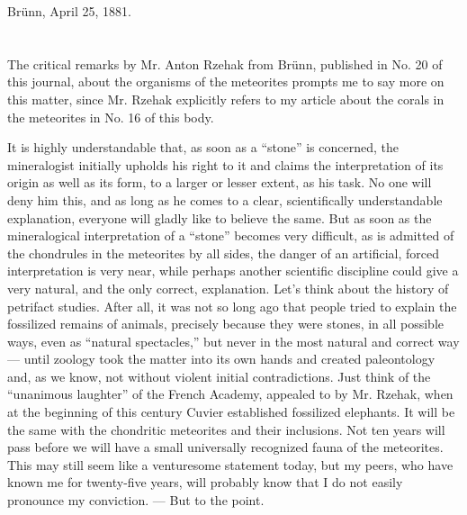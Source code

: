 \documentclass[a4paper, 12pt, oneside]{article}
\begin{document}
Brünn, April 25, 1881.
\clearpage
\section{}
\paragraph*{}
The critical remarks by Mr. Anton Rzehak from Brünn, published in No. 20 of this journal, about the organisms of the meteorites prompts me to say more on this matter, since Mr. Rzehak explicitly refers to my article about the corals in the meteorites in No. 16 of this body.

It is highly understandable that, as soon as a ``stone'' is concerned, the mineralogist initially upholds his right to it and claims the interpretation of its origin as well as its form, to a larger or lesser extent, as his task. No one will deny him this, and as long as he comes to a clear, scientifically understandable explanation, everyone will gladly like to believe the same. But as soon as the mineralogical interpretation of a ``stone'' becomes very difficult, as is admitted of the chondrules in the meteorites by all sides, the danger of an artificial, forced interpretation is very near, while perhaps another scientific discipline could give a very natural, and the only correct, explanation. Let's think about the history of petrifact studies. After all, it was not so long ago that people tried to explain the fossilized remains of animals, precisely because they were stones, in all possible ways, even as ``natural spectacles,'' but never in the most natural and correct way --- until zoology took the matter into its own hands and created paleontology and, as we know, not without violent initial contradictions. Just think of the ``unanimous laughter'' of the French Academy, appealed to by Mr. Rzehak, when at the beginning of this century Cuvier established fossilized elephants. It will be the same with the chondritic meteorites and their inclusions. Not ten years will pass before we will have a small universally recognized fauna of the meteorites. This may still seem like a venturesome statement today, but my peers, who have known me for twenty-five years, will probably know that I do not easily pronounce my conviction. --- But to the point.
\end{document}
